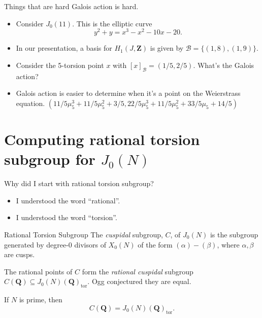 \documentclass{beamer}
\newcommand{\QQ}{\mathbf{Q}}
\newcommand{\ZZ}{\mathbf{Z}}
\renewcommand{\ZZ}{\mathbf{Z}}
\newcommand{\tor}{\mathrm{tor}}
\begin{document}
\begin{frame}{Things that are hard}
    Galois action is hard.
    \begin{itemize}
        \item
            Consider $J_0(11)$. This is the elliptic curve
            \[
                y^2 + y = x^3 - x^2 - 10x - 20.
            \]
            \pause
        \item
            In our presentation, a basis for $H_1(J, \ZZ)$ is given by
            $\mathcal{B}=\{(1,8), (1,9)\}$.
            \pause
        \item
            Consider the 5-torsion point $x$ with $[x]_\mathcal{B}=(1/5, 2/5)$.
            What's the Galois action?
            \pause
        \item
            Galois action is easier to determine when it's a point on the
            Weierstrass equation. $(11/5 \mu_5^3 + 11/5 \mu_5^2 + 3/5, 22/5
            \mu_5 ^3 + 11/5 \mu_5^2 + 33/5 \mu_5 + 14/5)$
    \end{itemize}
\end{frame}

\section{Computing rational torsion subgroup for $J_0(N)$}

\begin{frame}{Why did I start with rational torsion subgroup?}
    \pause
    \begin{itemize}
        \item
            I understood the word ``rational''.
    \pause
        \item
            I understood the word ``torsion''.
    \end{itemize}
\end{frame}


\begin{frame}{Rational Torsion Subgroup}
    The \emph{cuspidal} subgroup, $C$, of $J_0(N)$ is the subgroup generated by
    degree-0 divisors of $X_0(N)$ of the form $(\alpha)-(\beta)$, where
    $\alpha,\beta$ are cusps.

    The rational points of $C$ form the \emph{rational cuspidal} subgroup
    $C(\QQ)\subseteq J_0(N)(\QQ)_\tor$. Ogg conjectured they are equal.

    \begin{theorem}[Mazur '77]
        If $N$ is prime, then
        \[
            C(\QQ)=J_0(N)(\QQ)_\tor.
        \]
    \end{theorem}
\end{frame}
\end{document}
